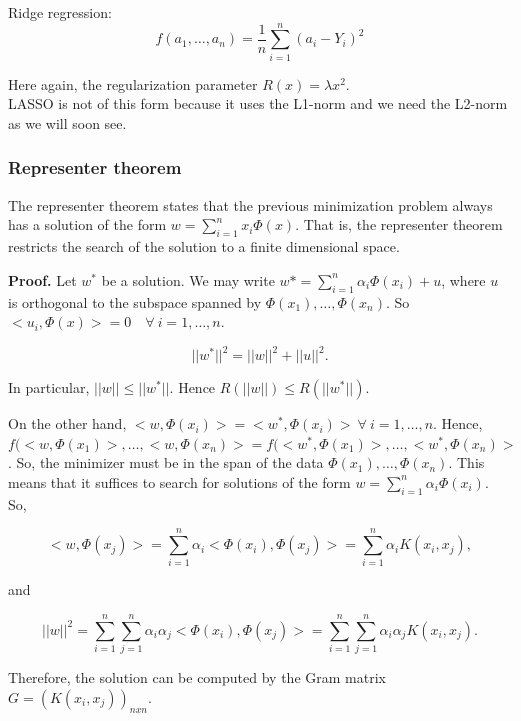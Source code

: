 \documentclass[11pt, english]{article}
\begin{document}
Ridge regression:
$$
f(a_1, \dots, a_n) = \frac{1}{n} \sum_{i=1}^{n}(a_i - Y_i)^2
$$

Here again, the regularization parameter $R(x) = \lambda x^2$.\\

LASSO is not of this form because it uses the L1-norm and we need the L2-norm as we will soon see.

\subsubsection{Representer theorem}

The representer theorem states that the previous minimization problem always has a solution of the form $w = \sum_{i=1}^{n} x_i \Phi(x)$. That is, the representer theorem restricts the search of the solution to a finite dimensional space.

\textbf{Proof.} Let $w^*$ be a solution. We may write $w* = \sum_{i=1}^{n}\alpha_i \Phi(x_i) + u$, where $u$ is orthogonal to the subspace spanned by $\Phi(x_1),\dots, \Phi(x_n)$. So $<u_i, \Phi(x)> = 0 \quad \forall \ i=1,\dots,n$.

\begin{equation}
||w^*||^2 = ||w||^2 + ||u||^2.
\end{equation}


In particular, $||w|| \leq ||w^*||$. Hence $R(||w||) \leq R(||w^*||).$

On the other hand, $<w,\Phi(x_i)> = <w^*, \Phi(x_i)> \ \forall \ i = 1,\dots, n$. Hence, $f(<w,\Phi(x_1)>, \dots, <w, \Phi (x_n)> = f(<w^*,\Phi(x_1)>, \dots, <w^*, \Phi (x_n)>$. So, the minimizer must be in the span of the data $\Phi(x_1), \dots, \Phi(x_n)$. This means that it suffices to search for solutions of the form $w = \sum_{i=1}^{n}\alpha_i \Phi(x_i)$. So,

\begin{equation}
<w,\Phi(x_j)> = \sum_{i=1}^{n} \alpha_i <\Phi(x_i), \Phi(x_j)> = \sum_{i=1}^{n}\alpha_i K(x_i, x_j),
\end{equation}

and

\begin{equation}
||w||^2 = \sum_{i=1}^{n} \sum_{j=1}^{n} \alpha_i \alpha_j <\Phi(x_i), \Phi(x_j)> = \sum_{i=1}^{n}\sum_{j=1}^{n} \alpha_i \alpha_j K(x_i, x_j).
\end{equation}

Therefore, the solution can be computed by the Gram matrix $G = (K(x_i,x_j))_{nxn}$.


 
\end{document}
